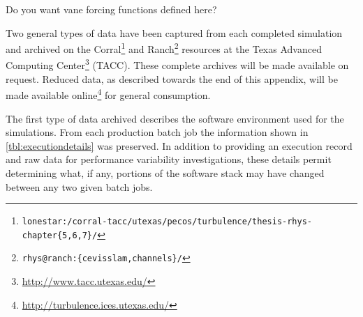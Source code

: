 \label{sec:archiving}

Do you want vane forcing functions defined here?


Two general types of data have been captured from each completed
simulation and archived on the Corral\footnote{%
    \texttt{lonestar:/corral-tacc/utexas/pecos/turbulence/thesis-rhys-chapter\{5,6,7\}/}
}
and Ranch\footnote{%
    \texttt{rhys@ranch:\{cevisslam,channels\}/}
}
resources at the Texas Advanced Computing Center\footnote{%
    \url{http://www.tacc.utexas.edu/}
}
(TACC).  These complete archives will be made available on request.  Reduced
data, as described towards the end of this appendix, will be made available
online\footnote{\url{http://turbulence.ices.utexas.edu/}} for general
consumption.

The first type of data archived describes the software environment used for the
simulations.  From each production batch job the information shown in
\autoref{tbl:executiondetails} was preserved.
%
In addition to providing an execution record and raw data for performance
variability investigations, these details permit determining what, if any,
portions of the software stack may have changed between any two given batch
jobs.

